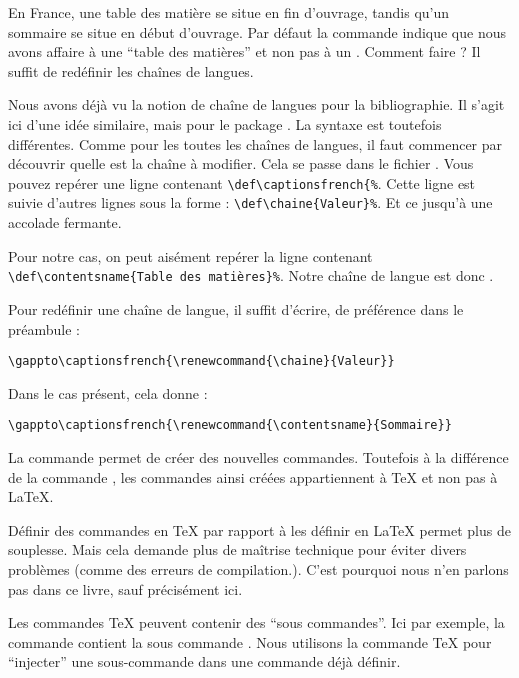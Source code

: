 En France, une table des matière se situe en fin d'ouvrage, tandis qu'un sommaire se situe en début d'ouvrage. Par défaut la commande  indique que nous avons affaire à une  \enquote{table des matières} et non pas à un . Comment faire ? Il suffit de redéfinir les chaînes de langues. 

Nous avons déjà vu la notion de chaîne de langues pour la bibliographie. Il s'agit ici  d'une idée similaire, mais pour le package . La syntaxe est toutefois différentes. Comme pour les toutes les chaînes de langues, il faut commencer par découvrir quelle est la chaîne à modifier. Cela se passe dans le fichier . Vous pouvez repérer une ligne contenant \verb|\def\captionsfrench{%|. 
Cette ligne est suivie d'autres lignes sous la forme : \verb|\def\chaine{Valeur}%|. Et ce jusqu'à une accolade fermante.

Pour notre cas, on peut aisément repérer la ligne contenant \verb|\def\contentsname{Table des matières}%|.
Notre chaîne de langue est donc .

Pour  redéfinir une chaîne de langue, il suffit d'écrire, de préférence dans le préambule :

\begin{verbatim}
\gappto\captionsfrench{\renewcommand{\chaine}{Valeur}}
\end{verbatim}

Dans le cas présent, cela donne :

\begin{verbatim}
\gappto\captionsfrench{\renewcommand{\contentsname}{Sommaire}}
\end{verbatim}



\begin{anedocte}
La commande  permet de créer des nouvelles commandes. Toutefois à la différence de la commande , les commandes ainsi créées appartiennent à \TeX{} et non pas à \LaTeX{}.

Définir des commandes en \TeX{} par rapport à les définir en \LaTeX{} permet plus de souplesse. Mais cela demande plus de maîtrise technique pour éviter divers problèmes (comme des erreurs de compilation.). C'est pourquoi nous n'en parlons pas dans ce livre, sauf précisément ici.

Les commandes \TeX{} peuvent contenir des \enquote{sous commandes}. Ici par exemple, la commande  contient la sous commande . Nous utilisons la commande \TeX{}  pour \enquote{injecter} une sous-commande dans une commande déjà définir.
\end{anedocte}


